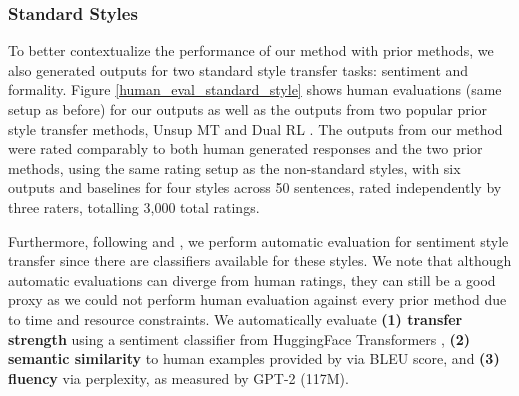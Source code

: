 \subsubsection{Standard Styles}
To better contextualize the performance of our method with prior methods, we also generated outputs for two standard style transfer tasks: sentiment and formality. 
Figure \ref{human_eval_standard_style} shows human evaluations (same setup as before) for our outputs as well as the outputs from two popular prior style transfer methods, Unsup MT \citep{prabhumoye-etal-2018-style} and Dual RL \citep{DBLP:conf/ijcai/LuoLZYCSS19}.
The outputs from our method were rated comparably to both human generated responses and the two prior methods, using the same rating setup as the non-standard styles, with six outputs and baselines for four styles across 50 sentences, rated independently by three raters, totalling 3,000 total ratings.

Furthermore, following \citet{li-etal-2018-delete} and \citet{sudhakar-etal-2019-transforming}, we perform automatic evaluation for sentiment style transfer since there are classifiers available for these styles. We note that although automatic evaluations can diverge from human ratings, they can still be a good proxy as we could not perform human evaluation against every prior method due to time and resource constraints.
We automatically evaluate \textbf{(1) transfer strength} using a sentiment classifier from HuggingFace Transformers \citep{wolf-etal-2020-transformers}, \textbf{(2) semantic similarity} to human examples provided by \citet{DBLP:conf/ijcai/LuoLZYCSS19} via BLEU score, and \textbf{(3) fluency} via perplexity, as measured by GPT-2 (117M).

